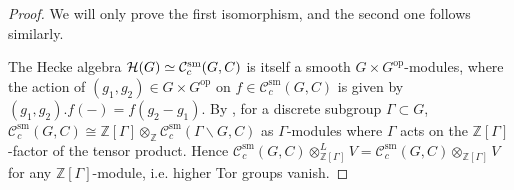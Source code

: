 \documentclass{article}
\theoremstyle{definition}
\def\calC{\mathcal{C}}
\def\calH{\mathcal{H}}
\def\bbZ{\mathbb{Z}}
\DeclareMathOperator{\ox}{\otimes}
\def\isom{\cong}
\DeclareMathOperator{\op}{op}
\def\sm{\mathrm{sm}}
\begin{document}
\begin{proof}
    We will only prove the first isomorphism, and the second one follows similarly. 

    The Hecke algebra $\calH(G)\simeq \calC_c^{\rm sm}(G,C)$ is itself a smooth $G\times G^{\op}$-modules, where the action of $(g_1,g_2)\in G\times G^{\op}$ on $f\in \calC^\sm_c(G,C)$ is given by $(g_1,g_2).f(-)=f(g_2-g_1)$. By \cite[Lemma A.6(a)]{Casselmansmoothcohomology}, for a discrete subgroup $\Gamma\subset G$, $\calC^{\sm}_c(G,C)\isom \bbZ[\Gamma]\otimes_{\bbZ}\calC^{\sm}_c(\Gamma\backslash G,C)$ as $\Gamma$-modules where $\Gamma$ acts on the $\bbZ[\Gamma]$-factor of the tensor product. Hence $\calC^{\sm}_c(G,C)\ox^L_{\bbZ[\Gamma]}V=\calC^{\sm}_c(G,C)\ox_{\bbZ[\Gamma]}V$ for any $\bbZ[\Gamma]$-module, i.e. higher Tor groups vanish. 


\end{proof}
\end{document}
